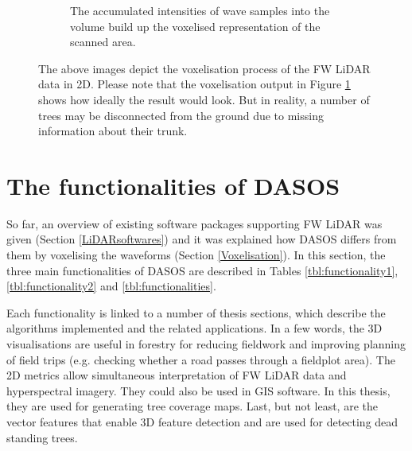 \documentclass{subfiles}
\begin{document}
{\begin{figure} [h!]
\begin{subfigure}[t]{.31\textwidth}
				\caption{The accumulated intensities of wave samples into the volume build up the voxelised representation of the scanned area.} 
				\label{fig:VoxelisationC_voxelised}
			\end{subfigure}
			\caption[Voxelisation of FW LiDAR data]{The above images depict the voxelisation process of the FW LiDAR data in 2D. Please note that the voxelisation output in Figure \ref{fig:VoxelisationC_voxelised} shows how ideally the result would look. But in reality, a number of trees may be disconnected from the ground due to missing information about their trunk. \footnotemark }  
			\label{fig:Voxelisation} 
		\end{figure}
		
	}
			

	\section{The functionalities of DASOS}\label{DASOS}
	
		\par So far, an overview of existing software packages supporting FW LiDAR was given (Section \ref{LiDARsoftwares}) and it was explained how DASOS differs from them by voxelising the waveforms (Section \ref{Voxelisation}). In this section, the three main functionalities of DASOS are described in Tables \ref{tbl:functionality1}, \ref{tbl:functionality2} and \ref{tbl:functionalities}.
		
	  	\par Each functionality is linked to a number of thesis sections, which describe the algorithms implemented and the related applications. In a few words, the 3D visualisations are useful in forestry for reducing fieldwork and improving planning of field trips (e.g. checking whether a road passes through a fieldplot area). The 2D metrics allow simultaneous interpretation of FW LiDAR data and hyperspectral imagery. They could also be used in GIS software. In this thesis, they are used for generating tree coverage maps. Last, but not least, are the vector features that enable 3D feature detection and are used for detecting dead standing trees.
\end{document}
